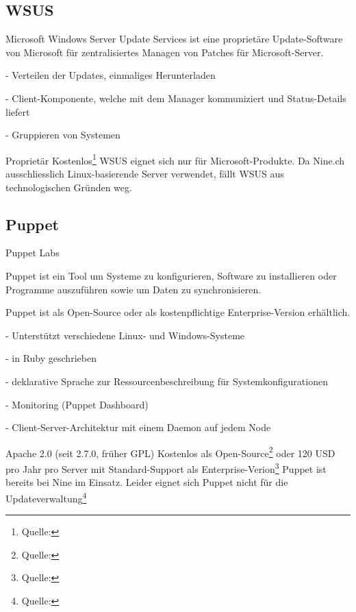 \subsection*{WSUS}

{Microsoft}
{Windows Server Update Services ist eine proprietäre Update-Software von Microsoft für zentralisiertes Managen von Patches für Microsoft-Server.}
{
- Verteilen der Updates, einmaliges Herunterladen

- Client-Komponente, welche mit dem Manager kommuniziert und Status-Details liefert

- Gruppieren von Systemen
}
{Proprietär}
{Kostenlos\footnote{Quelle: }}
{}
{WSUS eignet sich nur für Microsoft-Produkte. Da Nine.ch ausschliesslich Linux-basierende Server verwendet, fällt WSUS aus technologischen Gründen weg.}

\subsection*{Puppet}

{Puppet Labs}
{Puppet ist ein Tool um Systeme zu konfigurieren, Software zu installieren oder Programme auszuführen sowie um Daten zu synchronisieren.

Puppet ist als Open-Source oder als kostenpflichtige Enterprise-Version erhältlich. }
{
- Unterstützt verschiedene Linux- und Windows-Systeme

- in Ruby geschrieben

- deklarative Sprache zur Ressourcenbeschreibung für Systemkonfigurationen

- Monitoring (Puppet Dashboard)

- Client-Server-Architektur mit einem Daemon auf jedem Node
}
{Apache 2.0 (seit 2.7.0, früher GPL)}
{Kostenlos als Open-Source\footnote{Quelle: } oder 120 USD pro Jahr pro Server mit Standard-Support als Enterprise-Verion\footnote{Quelle: }}
{}
{Puppet ist bereits bei Nine im Einsatz. Leider eignet sich Puppet nicht für die Updateverwaltung\footnote{Quelle: }}
